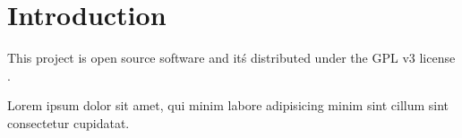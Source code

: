 \chapter{Introduction}

This project is open source software and it\'s distributed under the GPL v3 license \cite{gplv3} .

\newpage

Lorem ipsum dolor sit amet, qui minim labore adipisicing minim sint cillum sint consectetur cupidatat.
